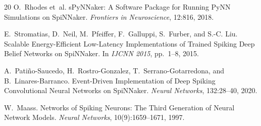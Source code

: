 \documentclass[sigconf,nonacm=false]{acmart}
\begin{document}
\begin{thebibliography}{20}
O.~Rhodes et~al.
\newblock sPyNNaker: A Software Package for Running PyNN Simulations on SpiNNaker.
\newblock \textit{Frontiers in Neuroscience}, 12:816, 2018.

E.~Stromatias, D.~Neil, M.~Pfeiffer, F.~Galluppi, S.~Furber, and S.-C. Liu.
\newblock Scalable Energy-Efficient Low-Latency Implementations of Trained Spiking Deep Belief Networks on SpiNNaker.
\newblock In \textit{IJCNN 2015}, pp.~1--8, 2015.

A.~Pati\~{n}o-Saucedo, H.~Rostro-Gonzalez, T.~Serrano-Gotarredona, and B.~Linares-Barranco.
\newblock Event-Driven Implementation of Deep Spiking Convolutional Neural Networks on SpiNNaker.
\newblock \textit{Neural Networks}, 132:28--40, 2020.

W.~Maass.
\newblock Networks of Spiking Neurons: The Third Generation of Neural Network Models.
\newblock \textit{Neural Networks}, 10(9):1659--1671, 1997.

\end{thebibliography}
\end{document}
